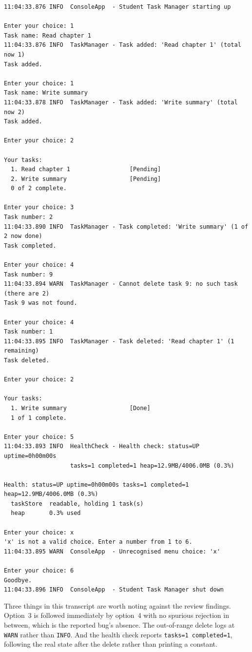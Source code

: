 \documentclass[11pt,a4paper]{article}
\newcommand{\code}[1]{\texttt{\small #1}}
\begin{document}
\begin{lstlisting}[style=plain]
11:04:33.876 INFO  ConsoleApp  - Student Task Manager starting up

Enter your choice: 1
Task name: Read chapter 1
11:04:33.876 INFO  TaskManager - Task added: 'Read chapter 1' (total now 1)
Task added.

Enter your choice: 1
Task name: Write summary
11:04:33.878 INFO  TaskManager - Task added: 'Write summary' (total now 2)
Task added.

Enter your choice: 2

Your tasks:
  1. Read chapter 1                 [Pending]
  2. Write summary                  [Pending]
  0 of 2 complete.

Enter your choice: 3
Task number: 2
11:04:33.890 INFO  TaskManager - Task completed: 'Write summary' (1 of 2 now done)
Task completed.

Enter your choice: 4
Task number: 9
11:04:33.894 WARN  TaskManager - Cannot delete task 9: no such task (there are 2)
Task 9 was not found.

Enter your choice: 4
Task number: 1
11:04:33.895 INFO  TaskManager - Task deleted: 'Read chapter 1' (1 remaining)
Task deleted.

Enter your choice: 2

Your tasks:
  1. Write summary                  [Done]
  1 of 1 complete.

Enter your choice: 5
11:04:33.893 INFO  HealthCheck - Health check: status=UP uptime=0h00m00s
                   tasks=1 completed=1 heap=12.9MB/4006.0MB (0.3%)

Health: status=UP uptime=0h00m00s tasks=1 completed=1 heap=12.9MB/4006.0MB (0.3%)
  taskStore  readable, holding 1 task(s)
  heap       0.3% used

Enter your choice: x
'x' is not a valid choice. Enter a number from 1 to 6.
11:04:33.895 WARN  ConsoleApp  - Unrecognised menu choice: 'x'

Enter your choice: 6
Goodbye.
11:04:33.896 INFO  ConsoleApp  - Student Task Manager shut down
\end{lstlisting}

Three things in this transcript are worth noting against the review findings.
Option~3 is followed immediately by option~4 with no spurious rejection in
between, which is the reported bug's absence. The out-of-range delete logs at
\code{WARN} rather than \code{INFO}. And the health check reports
\code{tasks=1 completed=1}, following the real state after the delete rather
than printing a constant.
\end{document}
